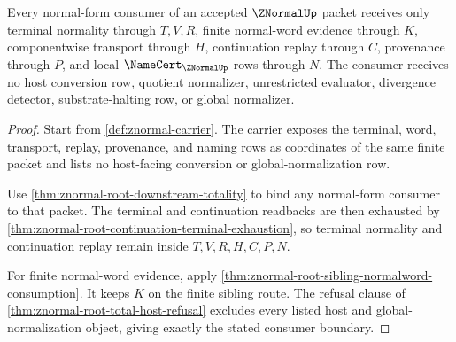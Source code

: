 \begin{theorem}
\label{thm:znormal-root-normal-form-consumer-boundary}
Every normal-form consumer of an accepted $\ZNormalUp$ packet receives only terminal normality through $T,V,R$, finite normal-word evidence through $K$, componentwise transport through $H$, continuation replay through $C$, provenance through $P$, and local $\NameCert_{\ZNormalUp}$ rows through $N$. The consumer receives no host conversion row, quotient normalizer, unrestricted evaluator, divergence detector, substrate-halting row, or global normalizer.
\end{theorem}
\begin{proof}
Start from \autoref{def:znormal-carrier}. The carrier exposes the terminal, word, transport, replay, provenance, and naming rows as coordinates of the same finite packet and lists no host-facing conversion or global-normalization row.

Use \autoref{thm:znormal-root-downstream-totality} to bind any normal-form consumer to that packet. The terminal and continuation readbacks are then exhausted by \autoref{thm:znormal-root-continuation-terminal-exhaustion}, so terminal normality and continuation replay remain inside $T,V,R,H,C,P,N$.

For finite normal-word evidence, apply \autoref{thm:znormal-root-sibling-normalword-consumption}. It keeps $K$ on the finite sibling route. The refusal clause of \autoref{thm:znormal-root-total-host-refusal} excludes every listed host and global-normalization object, giving exactly the stated consumer boundary.
\end{proof}

